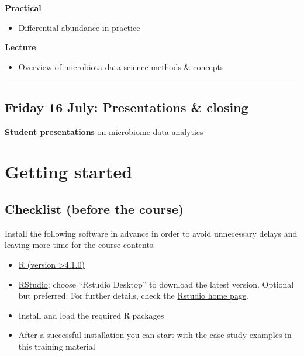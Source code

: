\documentclass[
  oneside]{book}
\providecommand{\tightlist}{%
  \setlength{\itemsep}{0pt}\setlength{\parskip}{0pt}}
\begin{document}
\textbf{Practical}

\begin{itemize}
\tightlist
\item
  Differential abundance in practice
\end{itemize}

\textbf{Lecture}

\begin{itemize}
\tightlist
\item
  Overview of microbiota data science methods \& concepts
\end{itemize}

\begin{center}\rule{0.5\linewidth}{0.5pt}\end{center}

\hypertarget{friday-16-july-presentations-closing}{%
\section{Friday 16 July: Presentations \& closing}\label{friday-16-july-presentations-closing}}

\textbf{Student presentations} on microbiome data analytics

\hypertarget{getting-started}{%
\chapter{Getting started}\label{getting-started}}

\hypertarget{checklist-before-the-course}{%
\section{Checklist (before the course)}\label{checklist-before-the-course}}

Install the following software in advance in order to avoid
unnecessary delays and leaving more time for the course contents.

\begin{itemize}
\item
  \href{https://www.r-project.org/}{R (version \textgreater4.1.0)}
\item
  \href{https://www.rstudio.com/products/rstudio/download/}{RStudio};
  choose ``Rstudio Desktop'' to download the latest version. Optional
  but preferred. For further details, check the \href{https://www.rstudio.com/}{Rstudio home
  page}.
\item
  Install and load the required R packages
\item
  After a successful installation you can start with the
  case study examples in this training material
\end{itemize}
\end{document}
